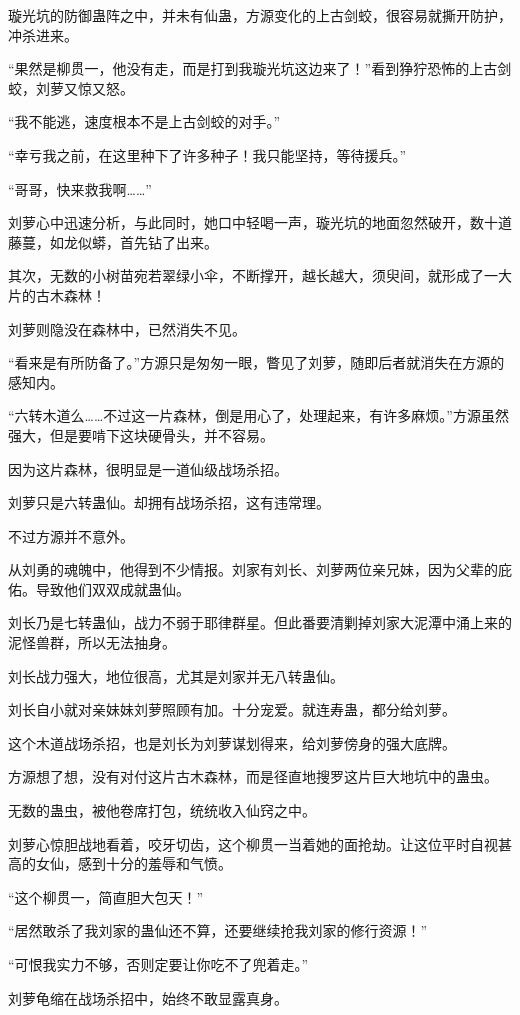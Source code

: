 \begin{this_body}
璇光坑的防御蛊阵之中，并未有仙蛊，方源变化的上古剑蛟，很容易就撕开防护，冲杀进来。

“果然是柳贯一，他没有走，而是打到我璇光坑这边来了！”看到狰狞恐怖的上古剑蛟，刘萝又惊又怒。

“我不能逃，速度根本不是上古剑蛟的对手。”

“幸亏我之前，在这里种下了许多种子！我只能坚持，等待援兵。”

“哥哥，快来救我啊……”

刘萝心中迅速分析，与此同时，她口中轻喝一声，璇光坑的地面忽然破开，数十道藤蔓，如龙似蟒，首先钻了出来。

其次，无数的小树苗宛若翠绿小伞，不断撑开，越长越大，须臾间，就形成了一大片的古木森林！

刘萝则隐没在森林中，已然消失不见。

“看来是有所防备了。”方源只是匆匆一眼，瞥见了刘萝，随即后者就消失在方源的感知内。

“六转木道么……不过这一片森林，倒是用心了，处理起来，有许多麻烦。”方源虽然强大，但是要啃下这块硬骨头，并不容易。

因为这片森林，很明显是一道仙级战场杀招。

刘萝只是六转蛊仙。却拥有战场杀招，这有违常理。

不过方源并不意外。

从刘勇的魂魄中，他得到不少情报。刘家有刘长、刘萝两位亲兄妹，因为父辈的庇佑。导致他们双双成就蛊仙。

刘长乃是七转蛊仙，战力不弱于耶律群星。但此番要清剿掉刘家大泥潭中涌上来的泥怪兽群，所以无法抽身。

刘长战力强大，地位很高，尤其是刘家并无八转蛊仙。

刘长自小就对亲妹妹刘萝照顾有加。十分宠爱。就连寿蛊，都分给刘萝。

这个木道战场杀招，也是刘长为刘萝谋划得来，给刘萝傍身的强大底牌。

方源想了想，没有对付这片古木森林，而是径直地搜罗这片巨大地坑中的蛊虫。

无数的蛊虫，被他卷席打包，统统收入仙窍之中。

刘萝心惊胆战地看着，咬牙切齿，这个柳贯一当着她的面抢劫。让这位平时自视甚高的女仙，感到十分的羞辱和气愤。

“这个柳贯一，简直胆大包天！”

“居然敢杀了我刘家的蛊仙还不算，还要继续抢我刘家的修行资源！”

“可恨我实力不够，否则定要让你吃不了兜着走。”

刘萝龟缩在战场杀招中，始终不敢显露真身。


\end{this_body}
